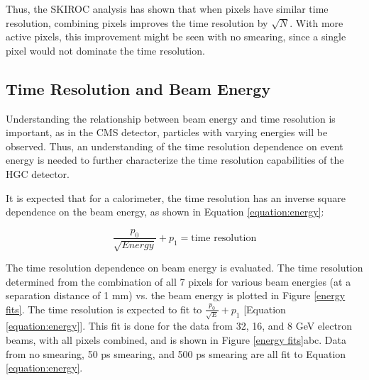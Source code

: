 \documentclass[twocolumn,aps,prd,reprint]{revtex4-1}
\begin{document}
Thus, the SKIROC analysis has shown that when pixels have similar time resolution, combining pixels improves the time resolution by $\sqrt{N}$. With more active pixels, this improvement might be seen with no smearing, since a single pixel would not dominate the time resolution.

\subsection{Time Resolution and Beam Energy}

Understanding the relationship between beam energy and time resolution is important, as in the CMS detector, particles with varying energies will be observed. Thus, an understanding of the time resolution dependence on event energy is needed to further characterize the time resolution capabilities of the HGC detector.

It is expected that for a calorimeter, the time resolution has an inverse square dependence on the beam energy, as shown in Equation \ref{equation:energy}:

\begin{equation}
\frac{p_0}{\sqrt{Energy}} + p_1 = \text{time resolution}
\label{equation:energy}
\end{equation}

The time resolution dependence on beam energy is evaluated. The time resolution determined from the combination of all 7 pixels for various beam energies (at a separation distance of 1 mm) vs. the beam energy is plotted in Figure \ref{energy fits}. The time resolution is expected to fit to $\frac{p_0}{\sqrt{E}} + p_1$ [Equation \ref{equation:energy}]. This fit is done for the data from 32, 16, and 8 GeV electron beams, with all pixels combined, and is shown in Figure \ref{energy fits}abc. Data from no smearing, 50 ps smearing, and 500 ps smearing are all fit to Equation \ref{equation:energy}.
\end{document}

